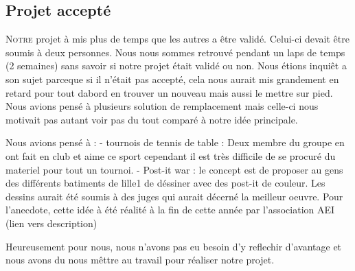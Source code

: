 \subsection{Projet accepté}%
\label{sub:projet_accepte}

\lettrine{N}{otre} projet à mis plus de temps que les autres a être
validé.  Celui-ci devait être soumis à deux personnes. Nous nous sommes
retrouvé pendant un laps de temps (2 semaines) sans savoir si notre
projet était validé ou non. Nous étions inquiêt a son sujet parceque si
il n'était pas accepté, cela nous aurait mis grandement en retard pour
tout dabord en trouver un nouveau mais aussi le mettre sur pied. Nous
avions pensé à plusieurs solution de remplacement mais celle-ci nous
motivait pas autant voir pas du tout comparé à notre idée principale.

Nous avions pensé à :
  - tournois de tennis de table : Deux membre du groupe en ont fait
en club et aime ce sport cependant il est très difficile de se procuré
du materiel pour tout un tournoi.
  - Post-it war : le concept est de proposer au gens des différents
batiments de lille1 de déssiner avec des post-it de couleur. Les dessins
aurait été soumis à des juges qui aurait décerné la meilleur oeuvre.
Pour l'anecdote, cette idée à été réalité à la fin de cette année par
l'association AEI (lien vers description)

Heureusement pour nous, nous n'avons pas eu besoin d'y reflechir
d'avantage et nous avons du nous mêttre au travail pour réaliser notre
projet.

